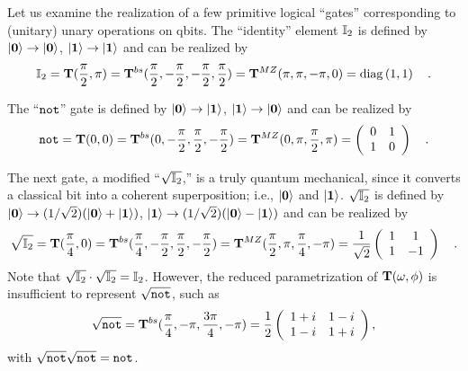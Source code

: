 \documentclass[pra,showpacs,showkeys,amsfonts]{revtex4}
\begin{document}
Let us examine the realization of a few primitive logical ``gates''
corresponding to (unitary) unary operations on qbits.
The ``identity'' element ${\Bbb I}_2$ is defined by
$\vert  {\bf 0}  \rangle  \rightarrow  \vert  {\bf 0}  \rangle $,
$\vert  {\bf 1}  \rangle  \rightarrow  \vert  {\bf 1}  \rangle $ and can be realized by
\begin{equation}
{\Bbb I}_2 =
{\bf T}({\pi \over 2},\pi)=
{\bf T}^{bs}({\pi \over 2},-{\pi \over 2},-{\pi \over 2},{\pi \over 2})=
{\bf T}^{MZ}(\pi ,\pi ,-\pi ,0)
={\rm diag}
\left( 1,1
\right)
\quad .
\end{equation}

The ``${\tt not}$'' gate is defined by
$\vert  {\bf 0}  \rangle  \rightarrow  \vert  {\bf 1}  \rangle $,
$\vert  {\bf 1}  \rangle  \rightarrow  \vert  {\bf 0}  \rangle $ and can be realized by
\begin{equation}
{\tt not} =
{\bf T}(0,0)=
{\bf T}^{bs}(0,-{\pi \over 2},{\pi \over 2},-{\pi \over 2})=
{\bf T}^{MZ}(0,\pi ,{\pi \over 2} ,\pi )
=
\left(
\begin{array}{cc}
0&1
\\
1&0
 \end{array}
\right)
\quad .
\end{equation}


The next gate, a modified ``$\sqrt{{\Bbb I}_2}$,'' is a truly quantum
mechanical, since it converts a classical bit
into
a coherent superposition; i.e., $\vert  {\bf 0}  \rangle $ and $\vert  {\bf 1}  \rangle $.
$\sqrt{{\Bbb I}_2}$ is defined by
$\vert  {\bf 0}  \rangle  \rightarrow  (1/\sqrt{2})(\vert  {\bf 0}  \rangle  + \vert  {\bf 1}  \rangle )$,
$\vert  {\bf 1}  \rangle  \rightarrow  (1/\sqrt{2})(\vert  {\bf 0}  \rangle  - \vert  {\bf 1}  \rangle )$ and can
be realized by
\begin{equation}
\sqrt{{\Bbb I}_2} =
{\bf T}({\pi \over 4},0)=
{\bf T}^{bs}({\pi \over 4},-{\pi \over 2},{\pi \over 2},-{\pi \over 2})=
{\bf T}^{MZ}({\pi \over 2},\pi ,{\pi \over 4} ,-\pi )
=
{1 \over \sqrt{2}}
\left(
\begin{array}{cc}
1&1
\\
1&-1
 \end{array}
\right)
\quad .
\end{equation}
Note that $\sqrt{{\Bbb I}_2}\cdot \sqrt{{\Bbb I}_2} = {\Bbb I}_2$.
However, the reduced parametrization of ${\bf T}(\omega,\phi)$
is insufficient to represent $\sqrt{{\tt not}}$, such as
\begin{equation}
\sqrt{{\tt not}} =
{\bf T}^{bs}({\pi \over 4},-\pi ,
{3\pi \over 4},
-\pi )=
{1 \over 2}
\left(
\begin{array}{cc}
1+i&1-i
\\
1-i&1+i
 \end{array}
\right)
,
\end{equation}
with
$
\sqrt{{\tt not}}
\sqrt{{\tt not}} = {\tt not}$.
\end{document}
